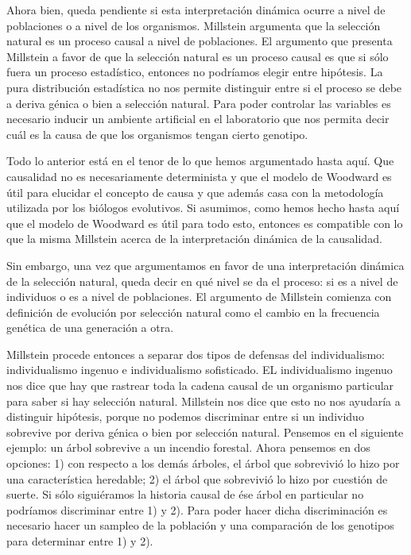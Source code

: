 Ahora bien, queda pendiente si esta interpretación dinámica ocurre a nivel de poblaciones o a nivel de los organismos. Millstein \citeyear{Millstein2006} argumenta que la selección natural es un proceso causal a nivel de poblaciones. El argumento que presenta Millstein a favor de que la selección natural es un proceso causal es que si sólo fuera un proceso estadístico, entonces no podríamos elegir entre hipótesis. La pura distribución estadística no nos permite distinguir entre si el proceso se debe a deriva génica o bien a selección natural. Para poder controlar las variables es necesario inducir un ambiente artificial en el laboratorio que nos permita decir cuál es la causa de que los organismos tengan cierto genotipo.

Todo lo anterior está en el tenor de lo que hemos argumentado hasta aquí. Que causalidad no es necesariamente determinista y que el modelo de Woodward es útil para elucidar el concepto de causa y que además casa con la metodología utilizada por los biólogos evolutivos. Si asumimos, como hemos hecho hasta aquí que el modelo de Woodward es útil para todo esto, entonces es compatible con lo que la misma Millstein acerca de la interpretación dinámica de la causalidad.

Sin embargo, una vez que argumentamos en favor de una interpretación dinámica de la selección natural, queda decir en qué nivel se da el proceso: si es a nivel de individuos o es a nivel de poblaciones. El argumento de Millstein comienza con definición de evolución por selección natural como el cambio en la frecuencia genética de una generación a otra.

Millstein procede entonces a separar dos tipos de defensas del individualismo: individualismo ingenuo e individualismo sofisticado. EL individualismo ingenuo nos dice que hay que rastrear toda la cadena causal de un organismo particular para saber si hay selección natural. Millstein nos dice que esto no nos ayudaría a distinguir hipótesis, porque no podemos discriminar entre si un individuo sobrevive por deriva génica o bien por selección natural. Pensemos en el siguiente ejemplo: un árbol sobrevive a un incendio forestal. Ahora pensemos en dos opciones: 1) con respecto a los demás árboles, el árbol que sobrevivió lo hizo por una característica heredable; 2) el árbol que sobrevivió lo hizo por cuestión de suerte. Si sólo siguiéramos la historia causal de ése árbol en particular no podríamos discriminar entre 1) y 2). Para poder hacer dicha discriminación es necesario hacer un sampleo de la población y una comparación de los genotipos para determinar entre 1) y 2).

